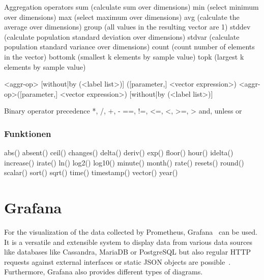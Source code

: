 Aggregation operators 
sum (calculate sum over dimensions)
min (select minimum over dimensions)
max (select maximum over dimensions)
avg (calculate the average over dimensions)
group (all values in the resulting vector are 1)
stddev (calculate population standard deviation over dimensions)
stdvar (calculate population standard variance over dimensions)
count (count number of elements in the vector)
bottomk (smallest k elements by sample value)
topk (largest k elements by sample value)

<aggr-op> [without|by (<label list>)] ([parameter,] <vector expression>)
<aggr-op>([parameter,] <vector expression>) [without|by (<label list>)]

Binary operator precedence 
*, /, %
+, -
==, !=, <=, <, >=, >
and, unless
or

\subsubsection{Funktionen}

abs()
absent()
ceil()
changes()
delta()
deriv()
exp()
floor()
hour()
idelta()
increase()
irate()
ln()
log2()
log10()
minute()
month()
rate()
resets()
round()
scalar()
sort()
sqrt()
time()
timestamp()
vector()
year()

\section{Grafana}
For the visualization of the data collected by Prometheus, Grafana~\citep{GrafanaHomepage} can be used. It is a versatile and extensible system to display data from various data sources like databases like Cassandra, MariaDB or PostgreSQL but also regular HTTP requests against external interfaces or static JSON objects are possible~\cite{GrafanaDataSources}. Furthermore, Grafana also provides different types of diagrams.

